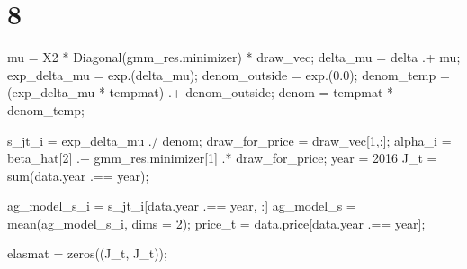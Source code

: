 \documentclass[
  letterpaper,
  DIV=11,
  numbers=noendperiod]{scrreprt}
\newenvironment{Shaded}{\begin{snugshade}}{\end{snugshade}}
\newcommand{\CharTok}[1]{\textcolor[rgb]{0.13,0.47,0.30}{#1}}
\newcommand{\FloatTok}[1]{\textcolor[rgb]{0.68,0.00,0.00}{#1}}
\newcommand{\FunctionTok}[1]{\textcolor[rgb]{0.28,0.35,0.67}{#1}}
\newcommand{\NormalTok}[1]{\textcolor[rgb]{0.00,0.23,0.31}{#1}}
\newcommand{\OperatorTok}[1]{\textcolor[rgb]{0.37,0.37,0.37}{#1}}
\begin{document}
\hypertarget{section-5}{%
\section{8}\label{section-5}}

\begin{Shaded}
\begin{Highlighting}[]
\NormalTok{mu }\OperatorTok{=}\NormalTok{ X2 }\OperatorTok{*} \FunctionTok{Diagonal}\NormalTok{(gmm\_res.minimizer) }\OperatorTok{*}\NormalTok{ draw\_vec;}
\NormalTok{delta\_mu }\OperatorTok{=}\NormalTok{ delta }\OperatorTok{.+}\NormalTok{ mu;}
\NormalTok{exp\_delta\_mu }\OperatorTok{=} \FunctionTok{exp}\NormalTok{.(delta\_mu);}
\NormalTok{denom\_outside }\OperatorTok{=} \FunctionTok{exp}\NormalTok{.(}\FloatTok{0.0}\NormalTok{);}
\NormalTok{denom\_temp }\OperatorTok{=}\NormalTok{ (exp\_delta\_mu}\OperatorTok{\textquotesingle{}} \OperatorTok{*}\NormalTok{ tempmat)}\CharTok{\textquotesingle{} .+ denom\_outside;}
\NormalTok{denom }\OperatorTok{=}\NormalTok{ tempmat }\OperatorTok{*}\NormalTok{ denom\_temp;}

\NormalTok{s\_jt\_i }\OperatorTok{=}\NormalTok{ exp\_delta\_mu }\OperatorTok{./}\NormalTok{ denom;}
\NormalTok{draw\_for\_price }\OperatorTok{=}\NormalTok{ draw\_vec[}\FloatTok{1}\NormalTok{,}\OperatorTok{:}\NormalTok{];}
\NormalTok{alpha\_i }\OperatorTok{=}\NormalTok{ beta\_hat[}\FloatTok{2}\NormalTok{] }\OperatorTok{.+}\NormalTok{ gmm\_res.minimizer[}\FloatTok{1}\NormalTok{] }\OperatorTok{.*}\NormalTok{ draw\_for\_price;}
\NormalTok{year }\OperatorTok{=} \FloatTok{2016}
\NormalTok{J\_t }\OperatorTok{=} \FunctionTok{sum}\NormalTok{(data.year }\OperatorTok{.==}\NormalTok{ year);}

\NormalTok{ag\_model\_s\_i }\OperatorTok{=}\NormalTok{ s\_jt\_i[data.year }\OperatorTok{.==}\NormalTok{ year, }\OperatorTok{:}\NormalTok{]}
\NormalTok{ag\_model\_s }\OperatorTok{=} \FunctionTok{mean}\NormalTok{(ag\_model\_s\_i, dims }\OperatorTok{=} \FloatTok{2}\NormalTok{);}
\NormalTok{price\_t }\OperatorTok{=}\NormalTok{ data.price[data.year }\OperatorTok{.==}\NormalTok{ year];}

\NormalTok{elasmat }\OperatorTok{=} \FunctionTok{zeros}\NormalTok{((J\_t, J\_t));}


\end{Highlighting}
\end{Shaded}
\end{document}
